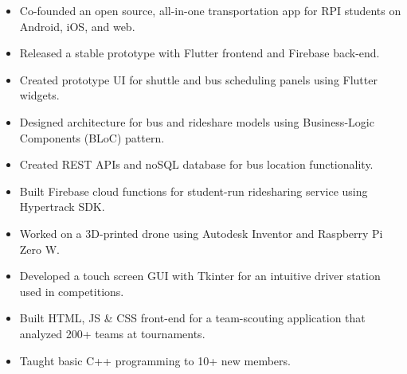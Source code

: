 \documentclass[10pt,a4paper,ragged2e]{altacv}
\begin{document}
\divider

\begin{itemize}
\item Co-founded an open source, all-in-one transportation app for RPI students on Android, iOS, and web.
\item Released a stable prototype with Flutter frontend and Firebase back-end.
\item Created prototype UI for shuttle and bus scheduling panels using Flutter widgets.
\item Designed architecture for bus and rideshare models using Business-Logic Components (BLoC) pattern.
\item Created REST APIs and noSQL database for bus location functionality.
\item Built Firebase cloud functions for student-run ridesharing service using Hypertrack SDK.
\end{itemize}

\divider



\begin{itemize}
\item Worked on a 3D-printed drone using Autodesk Inventor and Raspberry Pi Zero W.
\item Developed a touch screen GUI with Tkinter for an intuitive driver station used in competitions.
\item Built  HTML, JS \& CSS front-end for a team-scouting application that analyzed 200+ teams at tournaments.
\item Taught basic C++ programming to 10+ new members.
\end{itemize}


\clearpage


\nocite{*}


\end{document}
